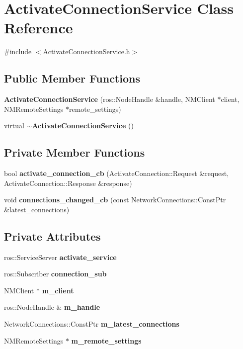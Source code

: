 \section{\-Activate\-Connection\-Service \-Class \-Reference}
\label{classActivateConnectionService}


{\ttfamily \#include $<$\-Activate\-Connection\-Service.\-h$>$}

\subsection*{\-Public \-Member \-Functions}
\begin{DoxyCompactItemize}
\item 
{\bf \-Activate\-Connection\-Service} (ros\-::\-Node\-Handle \&handle, \-N\-M\-Client $\ast$client, \-N\-M\-Remote\-Settings $\ast$remote\-\_\-settings)
\item 
virtual {\bf $\sim$\-Activate\-Connection\-Service} ()
\end{DoxyCompactItemize}
\subsection*{\-Private \-Member \-Functions}
\begin{DoxyCompactItemize}
\item 
bool {\bf activate\-\_\-connection\-\_\-cb} (\-Activate\-Connection\-::\-Request \&request, \-Activate\-Connection\-::\-Response \&response)
\item 
void {\bf connections\-\_\-changed\-\_\-cb} (const \-Network\-Connections\-::\-Const\-Ptr \&latest\-\_\-connections)
\end{DoxyCompactItemize}
\subsection*{\-Private \-Attributes}
\begin{DoxyCompactItemize}
\item 
ros\-::\-Service\-Server {\bf activate\-\_\-service}
\item 
ros\-::\-Subscriber {\bf connection\-\_\-sub}
\item 
\-N\-M\-Client $\ast$ {\bf m\-\_\-client}
\item 
ros\-::\-Node\-Handle \& {\bf m\-\_\-handle}
\item 
\-Network\-Connections\-::\-Const\-Ptr {\bf m\-\_\-latest\-\_\-connections}
\item 
\-N\-M\-Remote\-Settings $\ast$ {\bf m\-\_\-remote\-\_\-settings}
\end{DoxyCompactItemize}


